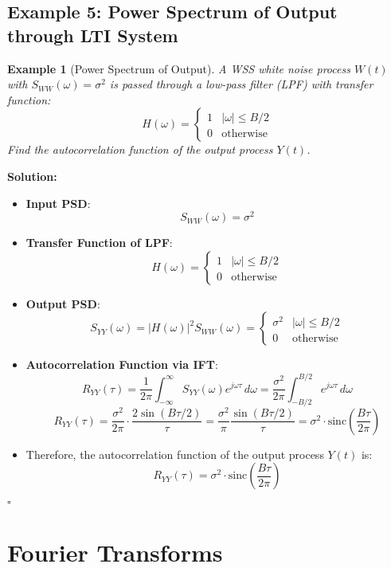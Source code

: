 \documentclass[12pt]{article}
\newtheorem{example}{Example}
\newenvironment{solution}{\noindent\textbf{Solution:}}{\hfill$\square$}
\begin{document}
\subsection{Example 5: Power Spectrum of Output through LTI System}
\begin{example}[Power Spectrum of Output]
A WSS white noise process \( W(t) \) with \( S_{WW}(\omega) = \sigma^2 \) is passed through a low-pass filter (LPF) with transfer function:
\[
H(\omega) = 
\begin{cases}
1 & |\omega| \leq B/2 \\
0 & \text{otherwise}
\end{cases}
\]
Find the autocorrelation function of the output process \( Y(t) \).
\end{example}
\begin{solution}
\begin{itemize}
    \item \textbf{Input PSD}:
    \[
    S_{WW}(\omega) = \sigma^2
    \]
    \item \textbf{Transfer Function of LPF}:
    \[
    H(\omega) = 
    \begin{cases}
    1 & |\omega| \leq B/2 \\
    0 & \text{otherwise}
    \end{cases}
    \]
    \item \textbf{Output PSD}:
    \[
    S_{YY}(\omega) = |H(\omega)|^2 S_{WW}(\omega) = 
    \begin{cases}
    \sigma^2 & |\omega| \leq B/2 \\
    0 & \text{otherwise}
    \end{cases}
    \]
    \item \textbf{Autocorrelation Function via IFT}:
    \[
    R_{YY}(\tau) = \frac{1}{2\pi} \int_{-\infty}^{\infty} S_{YY}(\omega) e^{j\omega \tau} \, d\omega = \frac{\sigma^2}{2\pi} \int_{-B/2}^{B/2} e^{j\omega \tau} \, d\omega
    \]
    \[
    R_{YY}(\tau) = \frac{\sigma^2}{2\pi} \cdot \frac{2 \sin(B\tau/2)}{\tau} = \frac{\sigma^2}{\pi} \frac{\sin(B\tau/2)}{\tau} = \sigma^2 \cdot \text{sinc}\left(\frac{B\tau}{2\pi}\right)
    \]
    \item Therefore, the autocorrelation function of the output process \( Y(t) \) is:
    \[
    R_{YY}(\tau) = \sigma^2 \cdot \text{sinc}\left(\frac{B\tau}{2\pi}\right)
    \]
\end{itemize}
\end{solution}

\section{Fourier Transforms}
\end{document}

